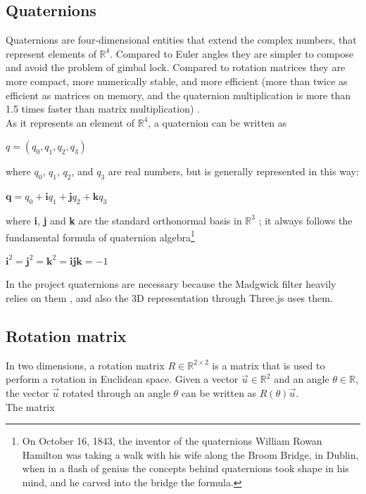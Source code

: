 \subsection{Quaternions}
Quaternions are four-dimensional entities that extend the complex numbers, that represent elements of $\mathbb{R}^4$. Compared to Euler angles they are simpler to compose and avoid the problem of gimbal lock. Compared to rotation matrices they are more compact, more numerically stable, and more efficient (more than twice as efficient as matrices on memory, and the quaternion multiplication is more than 1.5 times faster than matrix multiplication) \cite{Gol10}.\\
As it represents an element of $\mathbb{R}^4$, a quaternion can be written as

\begin{center}
	$q = (q_0, q_1, q_2, q_3)$
\end{center}

where $q_0$, $q_1$, $q_2$, and $q_3$ are real numbers, but is generally represented in this way:

\begin{center}
	$\textbf{q} = q_0 + \textbf{i}q_1 + \textbf{j}q_2 + \textbf{k}q_3$
\end{center}

where \textbf{i}, \textbf{j} and \textbf{k} are the standard orthonormal basis in $\mathbb{R}^3$ \cite{Kui99}; it always follows the fundamental formula of quaternion algebra\footnote{On October 16, 1843, the inventor of the quaternions William Rowan Hamilton was taking a walk with his wife along the Broom Bridge, in Dublin, when in a flash of genius the concepts behind quaternions took shape in his mind, and he carved into the bridge the formula.}

\begin{center}
	$\textbf{i}^2 = \textbf{j}^2 = \textbf{k}^2 = \textbf{ijk} = -1$
\end{center}

In the project quaternions are necessary because the Madgwick filter heavily relies on them \cite{Mad10}, and also the 3D representation through Three.js uses them.

\subsection{Rotation matrix}
In two dimensions, a rotation matrix $R \in \mathbb R^{2 \times 2}$ is a matrix that is used to perform a rotation in Euclidean space. Given a vector $\vec u \in \mathbb R^2$ and an angle $\theta \in \mathbb R$, the vector $\vec u$ rotated through an angle $\theta$ can be written as $R(\theta) \vec u$.\\
The matrix

